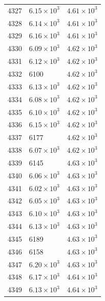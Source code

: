 \begin{table}[H]
\begin{tabular}{lll}
4327 & $\displaystyle 6.15 \times 10^{3}$ & $\displaystyle 4.61 \times 10^{3}$ \\
4328 & $\displaystyle 6.14 \times 10^{3}$ & $\displaystyle 4.61 \times 10^{3}$ \\
4329 & $\displaystyle 6.16 \times 10^{3}$ & $\displaystyle 4.61 \times 10^{3}$ \\
4330 & $\displaystyle 6.09 \times 10^{3}$ & $\displaystyle 4.62 \times 10^{3}$ \\
4331 & $\displaystyle 6.12 \times 10^{3}$ & $\displaystyle 4.62 \times 10^{3}$ \\
4332 & 6100 & $\displaystyle 4.62 \times 10^{3}$ \\
4333 & $\displaystyle 6.13 \times 10^{3}$ & $\displaystyle 4.62 \times 10^{3}$ \\
4334 & $\displaystyle 6.08 \times 10^{3}$ & $\displaystyle 4.62 \times 10^{3}$ \\
4335 & $\displaystyle 6.10 \times 10^{3}$ & $\displaystyle 4.62 \times 10^{3}$ \\
4336 & $\displaystyle 6.15 \times 10^{3}$ & $\displaystyle 4.62 \times 10^{3}$ \\
4337 & 6177 & $\displaystyle 4.62 \times 10^{3}$ \\
4338 & $\displaystyle 6.07 \times 10^{3}$ & $\displaystyle 4.62 \times 10^{3}$ \\
4339 & 6145 & $\displaystyle 4.63 \times 10^{3}$ \\
4340 & $\displaystyle 6.06 \times 10^{3}$ & $\displaystyle 4.63 \times 10^{3}$ \\
4341 & $\displaystyle 6.02 \times 10^{3}$ & $\displaystyle 4.63 \times 10^{3}$ \\
4342 & $\displaystyle 6.05 \times 10^{3}$ & $\displaystyle 4.63 \times 10^{3}$ \\
4343 & $\displaystyle 6.10 \times 10^{3}$ & $\displaystyle 4.63 \times 10^{3}$ \\
4344 & $\displaystyle 6.13 \times 10^{3}$ & $\displaystyle 4.63 \times 10^{3}$ \\
4345 & 6189 & $\displaystyle 4.63 \times 10^{3}$ \\
4346 & 6158 & $\displaystyle 4.63 \times 10^{3}$ \\
4347 & $\displaystyle 6.20 \times 10^{3}$ & $\displaystyle 4.63 \times 10^{3}$ \\
4348 & $\displaystyle 6.17 \times 10^{3}$ & $\displaystyle 4.64 \times 10^{3}$ \\
4349 & $\displaystyle 6.13 \times 10^{3}$ & $\displaystyle 4.64 \times 10^{3}$ \\

\end{tabular}
\end{table}
